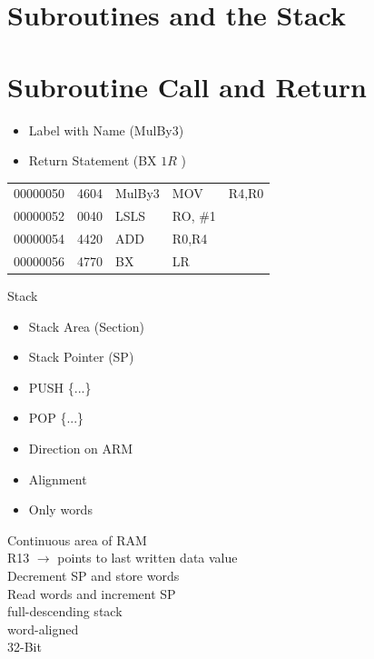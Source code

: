 \section{Subroutines and the Stack}

\section*{Subroutine Call and Return}
\begin{itemize}
  \item Label with Name (MulBy3)
  \item Return Statement (BX $1 R$ )
\end{itemize}

\begin{center}
\begin{tabular}{lllll}
00000050 & 4604 & MulBy3 & MOV & R4,R0 \\
00000052 & 0040 & LSLS & RO, \#1 &  \\
00000054 & 4420 & ADD & R0,R4 &  \\
00000056 & 4770 & BX & LR &  \\
\hline
\end{tabular}
\end{center}

Stack

\begin{itemize}
  \item Stack Area (Section)
  \item Stack Pointer (SP)
  \item PUSH \{...\}
  \item POP \{...\}
  \item Direction on ARM
  \item Alignment
  \item Only words
\end{itemize}

Continuous area of RAM\\
R13 $\rightarrow$ points to last written data value\\
Decrement SP and store words\\
Read words and increment SP\\
full-descending stack\\
word-aligned\\
32-Bit

